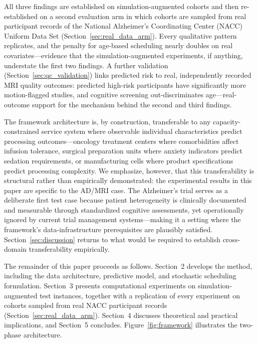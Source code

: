 \documentclass[11pt,a4paper]{article}
\newcommand{\rev}[1]{{\color{red}#1}}
\begin{document}
\rev{All three findings are established on simulation-augmented cohorts and then re-established on a second evaluation arm in which cohorts are sampled from real participant records of the National Alzheimer's Coordinating Center (NACC) Uniform Data Set (Section~\ref{sec:real_data_arm}). Every qualitative pattern replicates, and the penalty for age-based scheduling nearly doubles on real covariates---evidence that the simulation-augmented experiments, if anything, understate the first two findings. A further validation (Section~\ref{sec:qc_validation}) links predicted risk to real, independently recorded MRI quality outcomes: predicted high-risk participants have significantly more motion-flagged studies, and cognitive screening out-discriminates age---real-outcome support for the mechanism behind the second and third findings.}

The framework architecture is, by construction, transferable to any capacity-constrained service system where observable individual characteristics predict processing outcomes---oncology treatment centers where comorbidities affect infusion tolerance, surgical preparation units where anxiety indicators predict sedation requirements, or manufacturing cells where product specifications predict processing complexity. We emphasize, however, that this transferability is structural rather than empirically demonstrated: the experimental results in this paper are specific to the AD/MRI case. The Alzheimer's trial serves as a deliberate first test case because patient heterogeneity is clinically documented and measurable through standardized cognitive assessments, yet operationally ignored by current trial management systems---making it a setting where the framework's data-infrastructure prerequisites are plausibly satisfied. Section~\ref{sec:discussion} returns to what would be required to establish cross-domain transferability empirically.

The remainder of this paper proceeds as follows. Section~2 develops the method, including the data architecture, predictive model, and stochastic scheduling formulation. Section~3 presents computational experiments on simulation-augmented test instances\rev{, together with a replication of every experiment on cohorts sampled from real NACC participant records (Section~\ref{sec:real_data_arm})}. Section~4 discusses theoretical and practical implications, and Section~5 concludes. Figure~\ref{fig:framework} illustrates the two-phase architecture.
\end{document}

